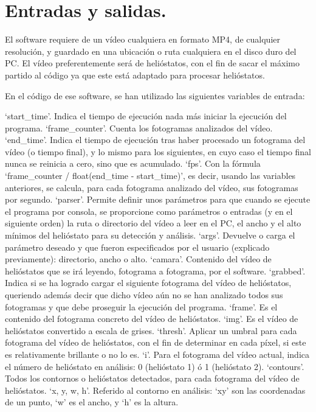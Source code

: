 \documentclass[12pt]{article}
\begin{document}
\section{Entradas y salidas.}

El software requiere de un vídeo cualquiera en formato MP4, de cualquier resolución, y guardado en una ubicación o ruta cualquiera en el disco duro del PC. El vídeo preferentemente será de helióstatos, con el fin de sacar el máximo partido al código ya que este está adaptado para procesar helióstatos.

En el código de ese software, se han utilizado las siguientes variables de entrada:

‘start\_time’. Indica el tiempo de ejecución nada más iniciar la ejecución del programa.
‘frame\_counter’. Cuenta los fotogramas analizados del vídeo.
‘end\_time’. Indica el tiempo de ejecución tras haber procesado un fotograma del vídeo (o tiempo final), y lo mismo para los siguientes, en cuyo caso el tiempo final nunca se reinicia a cero, sino que es acumulado.
‘fps’. Con la fórmula ‘frame\_counter / float(end\_time - start\_time)’, es decir, usando las variables anteriores, se calcula, para cada fotograma analizado del vídeo, sus fotogramas por segundo.
‘parser’. Permite definir unos parámetros para que cuando se ejecute el programa por consola, se proporcione como parámetros o entradas (y en el siguiente orden) la ruta o directorio del vídeo a leer en el PC, el ancho y el alto mínimos del helióstato para su detección y análisis.
‘args’. Devuelve o carga el parámetro deseado y que fueron especificados por el usuario (explicado previamente): directorio, ancho o alto.
‘camara’. Contenido del vídeo de helióstatos que se irá leyendo, fotograma a fotograma, por el software.
‘grabbed’. Indica si se ha logrado cargar el siguiente fotograma del vídeo de helióstatos, queriendo además decir que dicho vídeo aún no se han analizado todos sus fotogramas y que debe proseguir la ejecución del programa.
‘frame’. Es el contenido del fotograma concreto del vídeo de helióstatos.
‘img’. Es el vídeo de helióstatos convertido a escala de grises.
‘thresh’. Aplicar un umbral para cada fotograma del vídeo de helióstatos, con el fin de determinar en cada píxel, si este es relativamente brillante o no lo es.
‘i’. Para el fotograma del vídeo actual, indica el número de helióstato en análisis: 0 (helióstato 1) ó 1 (helióstato 2).
‘contours’. Todos los contornos o helióstatos detectados, para cada fotograma del vídeo de helióstatos.
‘x, y, w, h’. Referido al contorno en análisis: ‘xy’ son las coordenadas de un punto, ‘w’ es el ancho, y ‘h’ es la altura.
\end{document}
